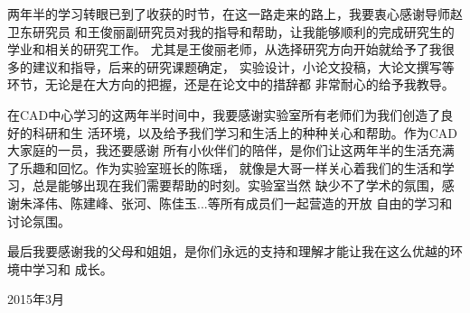 

\begin{ack}
  两年半的学习转眼已到了收获的时节，在这一路走来的路上，我要衷心感谢导师赵卫东研究员
  和王俊丽副研究员对我的指导和帮助，让我能够顺利的完成研究生的学业和相关的研究工作。
  尤其是王俊丽老师，从选择研究方向开始就给予了我很多的建议和指导，后来的研究课题确定，
  实验设计，小论文投稿，大论文撰写等环节，无论是在大方向的把握，还是在论文中的措辞都
  非常耐心的给予我教导。

  在CAD中心学习的这两年半时间中，我要感谢实验室所有老师们为我们创造了良好的科研和生
  活环境，以及给予我们学习和生活上的种种关心和帮助。作为CAD大家庭的一员，我还要感谢
  所有小伙伴们的陪伴，是你们让这两年半的生活充满了乐趣和回忆。作为实验室班长的陈瑶，
  就像是大哥一样关心着我们的生活和学习，总是能够出现在我们需要帮助的时刻。实验室当然
  缺少不了学术的氛围，感谢朱泽伟、陈建峰、张河、陈佳玉...等所有成员们一起营造的开放
  自由的学习和讨论氛围。

  最后我要感谢我的父母和姐姐，是你们永远的支持和理解才能让我在这么优越的环境中学习和
  成长。
  
  \vskip20pt
  \hfill 2015年3月
\end{ack}